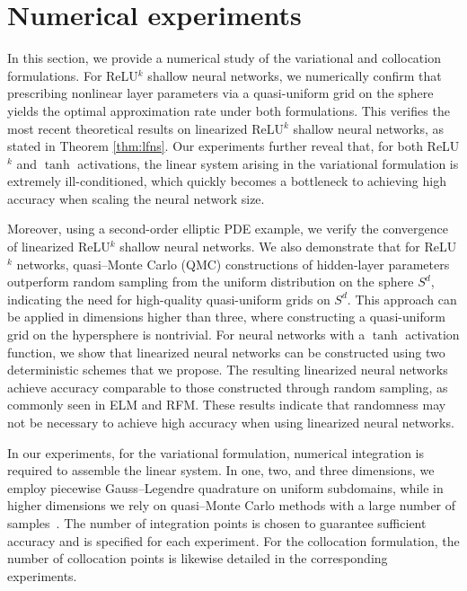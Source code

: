 \documentclass{article}
\theoremstyle{remark}
\begin{document}
\section{Numerical experiments}\label{sec:numerical-experiments}
In this section, we provide a numerical study of the variational and collocation formulations.
For ReLU$^k$ shallow neural networks, we numerically confirm that prescribing nonlinear layer parameters via a quasi-uniform grid on the sphere yields the optimal approximation rate under both formulations.
This verifies the most recent theoretical results on linearized ReLU$^k$ shallow neural networks, as stated in Theorem \ref{thm:lfns}.
Our experiments further reveal that, for both ReLU$^k$ and $\tanh$ activations, the linear system arising in the variational formulation is extremely ill-conditioned, which quickly becomes a bottleneck to achieving high accuracy when scaling the neural network size.

Moreover, using a second-order elliptic PDE example, we verify the convergence of linearized ReLU$^k$ shallow neural networks. 
We also demonstrate that for ReLU$^k$ networks, quasi–Monte Carlo (QMC) constructions of hidden-layer parameters outperform random sampling from the uniform distribution on the sphere $S^d$, indicating the need for high-quality quasi-uniform grids on $S^d$.
This approach can be applied in dimensions higher than three, where constructing a quasi-uniform grid on the hypersphere is nontrivial.
For neural networks with a $\tanh$ activation function, we show that linearized neural networks can be constructed using two deterministic schemes that we propose.
The resulting linearized neural networks achieve accuracy comparable to those constructed through random sampling, as commonly seen in ELM and RFM.
These results indicate that randomness may not be necessary to achieve high accuracy when using linearized neural networks.

In our experiments, for the variational formulation, numerical integration is required to assemble the linear system. 
In one, two, and three dimensions, we employ piecewise Gauss–Legendre quadrature on uniform subdomains, while in higher dimensions we rely on quasi–Monte Carlo methods with a large number of samples~\cite{Caflisch:1998,MC:1995}. 
The number of integration points is chosen to guarantee sufficient accuracy and is specified for each experiment. 
For the collocation formulation, the number of collocation points is likewise detailed in the corresponding experiments.
\end{document}
